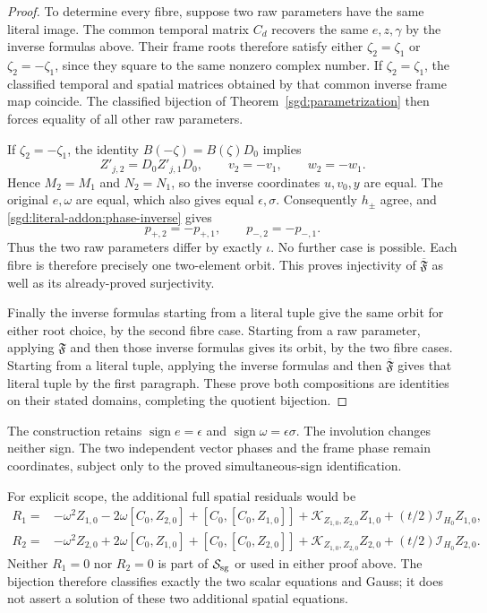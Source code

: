 \begin{proof}
To determine every fibre, suppose two raw parameters have the same
literal image. The common temporal matrix $C_d$ recovers the same
$e,z,\gamma$ by the inverse formulas above. Their frame roots
therefore satisfy either $\zeta_2=\zeta_1$ or
$\zeta_2=-\zeta_1$, since they square to the same nonzero complex
number. If $\zeta_2=\zeta_1$, the classified temporal and spatial
matrices obtained by that common inverse frame map coincide.
The classified bijection of Theorem~\ref{sgd:parametrization}
then forces equality of all other raw parameters.

If $\zeta_2=-\zeta_1$, the identity
$B(-\zeta)=B(\zeta)D_0$ implies
\[
 Z'_{j,2}=D_0Z'_{j,1}D_0,\qquad
 v_2=-v_1,\qquad w_2=-w_1.
\]
Hence $M_2=M_1$ and $N_2=N_1$, so the inverse coordinates
$u,v_0,y$ are equal. The original $e,\omega$ are equal, which
also gives equal $\epsilon,\sigma$. Consequently $h_\pm$ agree,
and \eqref{sgd:literal-addon:phase-inverse} gives
\[
 p_{+,2}=-p_{+,1},\qquad p_{-,2}=-p_{-,1}.
\]
Thus the two raw parameters differ by exactly $\iota$.
No further case is possible. Each fibre is therefore precisely
one two-element orbit. This proves injectivity of
$\overline{\mathfrak F}$ as well as its already-proved surjectivity.

Finally the inverse formulas starting from a literal tuple give
the same orbit for either root choice, by the second fibre case.
Starting from a raw parameter, applying $\mathfrak F$ and then those
inverse formulas gives its orbit, by the two fibre cases.
Starting from a literal tuple, applying the inverse formulas and
then $\overline{\mathfrak F}$ gives that literal tuple by the first
paragraph. These prove both compositions are identities on their
stated domains, completing the quotient bijection.
\end{proof}

The construction retains
$\operatorname{sign}e=\epsilon$ and
$\operatorname{sign}\omega=\epsilon\sigma$.
The involution changes neither sign. The two independent vector phases
and the frame phase remain coordinates, subject only to the proved
simultaneous-sign identification.

For explicit scope, the additional full spatial residuals would be
\begin{align*}
 R_1={}&-\omega^2Z_{1,0}-2\omega[C_0,Z_{2,0}]
 +[C_0,[C_0,Z_{1,0}]]
 +\mathcal K_{Z_{1,0},Z_{2,0}}Z_{1,0}
 +(t/2)\mathcal I_{H_0}Z_{1,0},\\
 R_2={}&-\omega^2Z_{2,0}+2\omega[C_0,Z_{1,0}]
 +[C_0,[C_0,Z_{2,0}]]
 +\mathcal K_{Z_{1,0},Z_{2,0}}Z_{2,0}
 +(t/2)\mathcal I_{H_0}Z_{2,0}.
\end{align*}
Neither $R_1=0$ nor $R_2=0$ is part of
$\mathcal S_{\rm sg}$ or used in either proof above.
The bijection therefore classifies exactly the two scalar equations
and Gauss; it does not assert a solution of these two additional
spatial equations.
